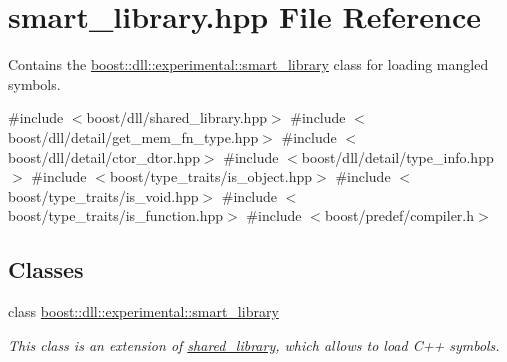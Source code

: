 \hypertarget{a00275}{}\section{smart\+\_\+library.\+hpp File Reference}
\label{a00275}


Contains the \hyperlink{a01712}{boost\+::dll\+::experimental\+::smart\+\_\+library} class for loading mangled symbols.  


{\ttfamily \#include $<$boost/dll/shared\+\_\+library.\+hpp$>$}\newline
{\ttfamily \#include $<$boost/dll/detail/get\+\_\+mem\+\_\+fn\+\_\+type.\+hpp$>$}\newline
{\ttfamily \#include $<$boost/dll/detail/ctor\+\_\+dtor.\+hpp$>$}\newline
{\ttfamily \#include $<$boost/dll/detail/type\+\_\+info.\+hpp$>$}\newline
{\ttfamily \#include $<$boost/type\+\_\+traits/is\+\_\+object.\+hpp$>$}\newline
{\ttfamily \#include $<$boost/type\+\_\+traits/is\+\_\+void.\+hpp$>$}\newline
{\ttfamily \#include $<$boost/type\+\_\+traits/is\+\_\+function.\+hpp$>$}\newline
{\ttfamily \#include $<$boost/predef/compiler.\+h$>$}\newline
\subsection*{Classes}
\begin{DoxyCompactItemize}
\item 
class \hyperlink{a01712}{boost\+::dll\+::experimental\+::smart\+\_\+library}
\begin{DoxyCompactList}\small\item\em This class is an extension of \hyperlink{a01708}{shared\+\_\+library}, which allows to load C++ symbols. \end{DoxyCompactList}\end{DoxyCompactItemize}
